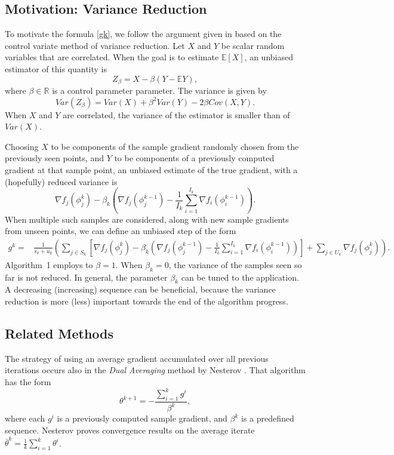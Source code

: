 \documentclass[11pt]{article}
\begin{document}
\subsection{Motivation: Variance Reduction}
To motivate the formula \eqref{gk}, we follow the argument given in  \cite{NIPS2014_5258} based on the control variate method of variance reduction.  Let $X$ and $Y$ be scalar random variables that are correlated. When the goal is to estimate $\mathbb{E} [X]$, an unbiased estimator of this quantity is
\[ Z_\beta = X - \beta ( Y - \mathbb{E}Y), \]
where $\beta \in \mathbb{R}$ is a control parameter parameter.
The variance is given by
\[ Var( Z_\beta) = Var(X) + \beta^2 Var(Y) -2 \beta Cov(X,Y). \]
When $X$ and $Y$ are correlated, the variance of the estimator is smaller than of $Var(X)$.

Choosing $X$ to be components of the sample gradient randomly chosen from the previously seen points, and $Y$ to be components of a previously computed gradient at that sample point, an unbiased estimate of the true gradient, with a (hopefully) reduced variance is
\[  \nabla f_j(\phi_j^{k}) - \beta_k \left( \nabla f_j(\phi^{k-1}_j) - \frac{1}{I_{k}} \sum_{i = 1}^{I_{k} }  \nabla f_i (\phi_i^{k-1}) \right). \]
When multiple such samples are considered, along with new sample gradients from unseen points, we can define an unbiased step of the form 
\begin{align*}
	g^k = & \frac{1}{s_k+u_k} \left(  \sum_{j \in S_k} \left[  \nabla f_j(\phi_j^{k}) - \beta_k \left(  \nabla f_j(\phi^{k-1}_j) - \frac{1}{I_{k}} \sum_{i = 1}^{I_{k} }  \nabla f_i (\phi_i^{k-1}) \right) \right] + \sum_{j \in U_k}  \nabla f_j(\phi_j^{k})\right). 
\end{align*}
Algorithm~1 employs to $\beta=1$. When $\beta_k=0$, the variance of the samples seen so far is not reduced. In general, the parameter $\beta_k$ can be tuned to the application.  A decreasing (increasing) sequence can be beneficial, because the variance reduction is more (less) important towards the end of the algorithm progress. 

\subsection{Related Methods}


The strategy of using an average gradient accumulated over all previous iterations occurs also in the \emph{Dual Averaging} method by Nesterov \cite{Nesterov:09}. That algorithm has the form
\[ \theta^{k+1} = -\frac{\sum_{i=1}^{k}g^i}{\beta^k}, \]
where each $g^i$ is a previously computed sample gradient, and $\beta^k$ is a  predefined sequence. Nesterov proves convergence results on the average iterate $\bar{\theta}^k = \frac{1}{k} \sum_{i=1}^{k} \theta^i$.
\end{document}
